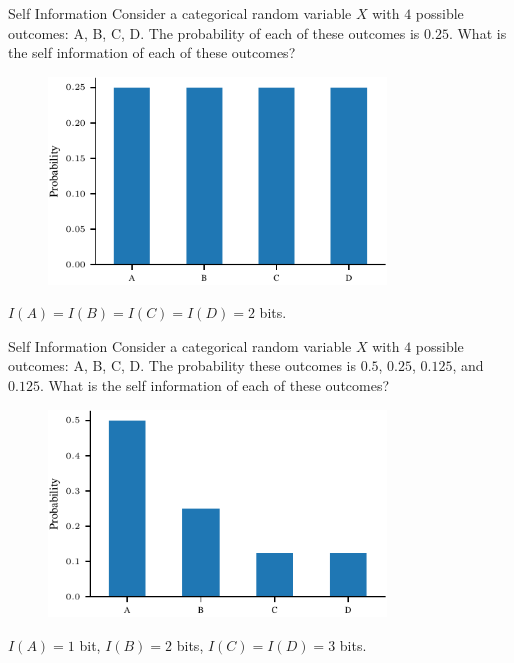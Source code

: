 \documentclass[handout]{beamer}
\begin{document}
\begin{frame}{Self Information}
    Consider a categorical random variable $X$ with $4$ possible outcomes: A, B, C, D. The probability of each of these outcomes is $0.25$. What is the self information of each of these outcomes?
    \begin{figure}
        \centering
        \includegraphics[width=0.8\textwidth]{notebooks/figures/information-theory/categorical-uniform.pdf}
        \label{fig:self_info_categorical_uniform}
    \end{figure}

    $I(A) = I(B) = I(C) = I(D) = 2$ bits.

\end{frame}

\begin{frame}{Self Information}
    Consider a categorical random variable $X$ with $4$ possible outcomes: A, B, C, D. The probability these outcomes is $0.5$, $0.25$, $0.125$, and $0.125$. What is the self information of each of these outcomes?
    \begin{figure}
        \centering
        \includegraphics[width=0.8\textwidth]{notebooks/figures/information-theory/categorical-nonuniform.pdf}
        \label{fig:self_info_categorical_nonuniform}
    \end{figure}

    $I(A) = 1$ bit, $I(B) = 2$ bits, $I(C) = I(D) = 3$ bits.

\end{frame}
\end{document}
